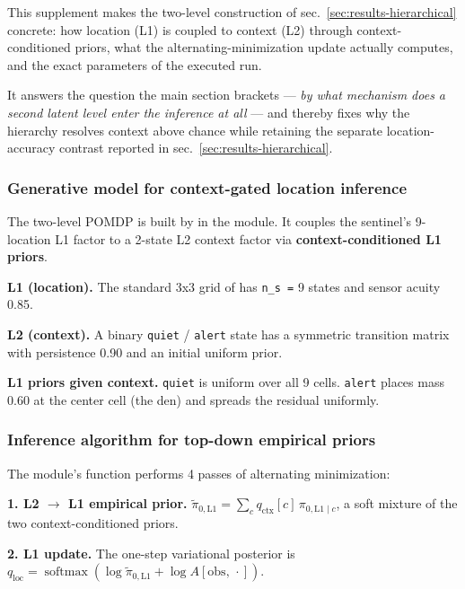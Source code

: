 \documentclass[
  english,
]{article}
\theoremstyle{plain}
\theoremstyle{definition}
\theoremstyle{remark}
\theoremstyle{definition}
\begin{document}
This supplement makes the two-level construction of
sec.~\ref{sec:results-hierarchical} concrete: how location (L1) is
coupled to context (L2) through context-conditioned priors, what the
alternating-minimization update actually computes, and the exact
parameters of the executed run.

It answers the question the main section brackets --- \emph{by what
mechanism does a second latent level enter the inference at all} --- and
thereby fixes why the hierarchy resolves context above chance while
retaining the separate location-accuracy contrast reported in
sec.~\ref{sec:results-hierarchical}.

\subsubsection{Generative model for context-gated location
inference}\label{generative-model-for-context-gated-location-inference}

The two-level POMDP is built by  in
the  module. It couples the sentinel's
9-location L1 factor to a 2-state L2 context factor via
\textbf{context-conditioned L1 priors}.

\textbf{L1 (location).} The standard 3x3 grid of
 has \texttt{n\_s\ =} 9 states and sensor
acuity 0.85.

\textbf{L2 (context).} A binary \texttt{quiet} / \texttt{alert} state
has a symmetric transition matrix with persistence 0.90 and an initial
uniform prior.

\textbf{L1 priors given context.} \texttt{quiet} is uniform over all 9
cells. \texttt{alert} places mass 0.60 at the center cell (the den) and
spreads the residual uniformly.

\subsubsection{Inference algorithm for top-down empirical
priors}\label{inference-algorithm-for-top-down-empirical-priors}

The module's  function performs 4 passes of
alternating minimization:

\textbf{1. L2 \texorpdfstring{\ensuremath{\to}}{->} L1 empirical prior.} \(\widetilde{\pi}_{0,\mathrm{L1}} =
\sum_c q_{\text{ctx}}[c]\,\pi_{0,\mathrm{L1}\mid c}\), a soft mixture of
the two context-conditioned priors.

\textbf{2. L1 update.} The one-step variational posterior is
\(q_{\text{loc}} = \operatorname{softmax}(\log \widetilde{\pi}_{0,\mathrm{L1}} +
\log A[\text{obs},\,\cdot])\).
\end{document}
